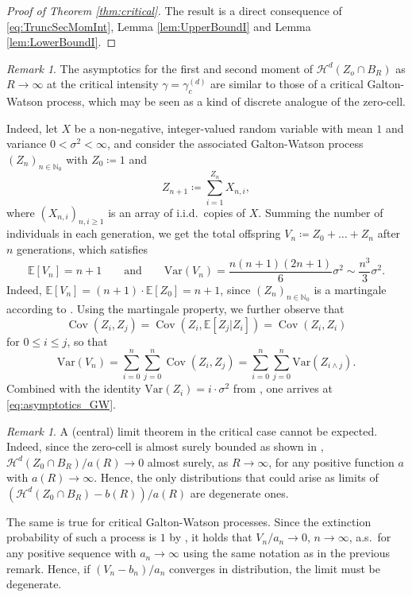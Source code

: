 \documentclass[11pt,a4paper]{article}
\theoremstyle{plain}
\theoremstyle{definition}
\theoremstyle{remark}
\newtheorem{remark}[theorem]{Remark}
\newcommand{\cov}{\operatorname{Cov}}
\def\EE{\mathbb{E}}
\def\NN{\mathbb{N}}
\def\cH{\mathcal{H}}
\newcommand{\E}{\mathbb{E}}
\newcommand{\Var}{\mathrm{Var}}
\begin{document}
\begin{proof}[Proof of Theorem \ref{thm:critical}]
    The result is a direct consequence of \eqref{eq:TruncSecMomInt}, Lemma \ref{lem:UpperBoundI} and Lemma \ref{lem:LowerBoundI}.
\end{proof}

\begin{remark}
    The asymptotics for the first and second moment of $\cH^d(Z_o \cap B_R)$ as $R \to \infty$ at the critical intensity $\gamma=\gamma_c^{(d)}$ are similar to those of a critical Galton-Watson process, which may be seen as a kind of discrete analogue of the zero-cell.

    Indeed, let $X$ be a non-negative, integer-valued random variable with mean $1$ and variance $0<\sigma^2<\infty$, and consider the associated Galton-Watson process $(Z_n)_{n \in \NN_0}$ with $Z_0 \coloneqq 1$ and
    \[ Z_{n+1} \coloneqq \sum_{i=1}^{Z_n} X_{n,i}, \]
    where $(X_{n,i})_{n,i\geq 1}$ is an array of i.i.d.\ copies of $X$.
    Summing the number of individuals in each generation, we get the total offspring $V_n \coloneqq Z_0 + \ldots + Z_n$ after $n$ generations, which satisfies
 \begin{equation}\label{eq:asymptotics_GW}
        \E[V_n] = n+1 \qquad \text{and} \qquad \Var(V_n) = \frac{n(n+1)(2n+1)}{6} \sigma^2 \sim \frac{n^3}{3}\sigma^2.
    \end{equation}
    Indeed, $\E[V_n] = (n+1) \cdot \E[Z_0] = n+1$, since $(Z_n)_{n\in\NN_0}$ is a martingale according to \cite[Theorem I.6.1]{AthreyaNey}.
    Using the martingale property, we further observe that
    \[ \cov(Z_i,Z_j) = \cov(Z_i,\EE[Z_j|Z_i]) = \cov(Z_i,Z_i) \]
    for $0 \leq i \leq j$, so that
    \[ \Var(V_n) = \sum_{i=0}^n \sum_{j=0}^n \cov(Z_i,Z_j) = \sum_{i=0}^n\sum_{j=0}^n \Var(Z_{i\wedge j}). \]
    Combined with the identity $\Var(Z_i) = i \cdot \sigma^2$ from \cite[Equation (I.2.2)]{AthreyaNey}, one arrives at \eqref{eq:asymptotics_GW}.
\end{remark}

\begin{remark}
    A (central) limit theorem in the critical case cannot be expected.
    Indeed, since the zero-cell is almost surely bounded as shown in \cite{BuehlerGusakovaRecke,GodlandKabluchkoThaeleBetaStar,PorretBlanc}, $\cH^{d}(Z_0 \cap B_R) / a(R) \to 0$ almost surely, as $R\to\infty$, for any positive function $a$ with $a(R) \to \infty$.
    Hence, the only distributions that could arise as limits of $(\cH^{d}(Z_0 \cap B_R) - b(R)) / a(R)$ are degenerate ones.

    The same is true for critical Galton-Watson processes.
    Since the extinction probability of such a process is $1$ by \cite[Theorem I.5.1]{AthreyaNey}, it holds that $V_n / a_n \to 0$, $n \to \infty$, a.s.\ for any positive sequence with $a_n \to \infty$ using the same notation as in the previous remark.
    Hence, if $(V_n-b_n)/a_n$ converges in distribution, the limit must be degenerate.
\end{remark}
\end{document}
